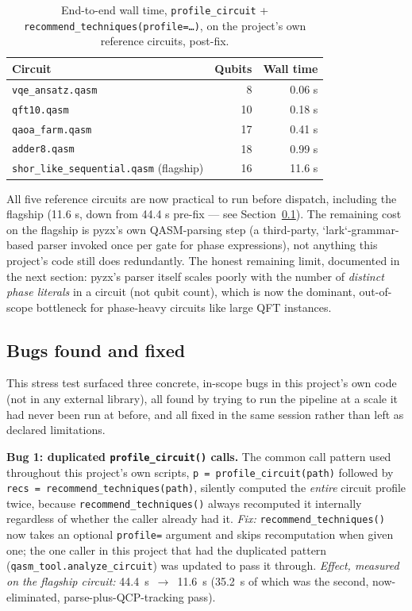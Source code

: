 \documentclass[9pt,twocolumn]{extarticle}
\begin{document}
\begin{table}[t]
\centering\footnotesize
\begin{tabular}{lrr}
\toprule
Circuit & Qubits & Wall time \\
\midrule
\texttt{vqe\_ansatz.qasm} & 8 & 0.06 s \\
\texttt{qft10.qasm} & 10 & 0.18 s \\
\texttt{qaoa\_farm.qasm} & 17 & 0.41 s \\
\texttt{adder8.qasm} & 18 & 0.99 s \\
\texttt{shor\_like\_sequential.qasm} (flagship) & 16 & 11.6 s \\
\bottomrule
\end{tabular}
\caption{End-to-end wall time, \texttt{profile\_circuit} +
\texttt{recommend\_techniques(profile=\ldots)}, on the project's own
reference circuits, post-fix.}
\label{tab:latency}
\end{table}

All five reference circuits are now practical to run before dispatch,
including the flagship (11.6 s, down from 44.4 s pre-fix --- see
Section~\ref{sec:stresstest-bugfixes}). The remaining cost on the flagship
is pyzx's own QASM-parsing step (a third-party, `lark`-grammar-based
parser invoked once per gate for phase expressions), not anything this
project's code still does redundantly. The honest remaining limit,
documented in the next section: pyzx's parser itself scales poorly with
the number of \emph{distinct phase literals} in a circuit (not qubit
count), which is now the dominant, out-of-scope bottleneck for
phase-heavy circuits like large QFT instances.

\subsection{Bugs found and fixed}
\label{sec:stresstest-bugfixes}
This stress test surfaced three concrete, in-scope bugs in this project's
own code (not in any external library), all found by trying to run the
pipeline at a scale it had never been run at before, and all fixed in the
same session rather than left as declared limitations.

\textbf{Bug 1: duplicated \texttt{profile\_circuit()} calls.} The common
call pattern used throughout this project's own scripts,
\texttt{p = profile\_circuit(path)} followed by
\texttt{recs = recommend\_techniques(path)}, silently computed the
\emph{entire} circuit profile twice, because \texttt{recommend\_techniques()}
always recomputed it internally regardless of whether the caller already
had it. \emph{Fix:} \texttt{recommend\_techniques()} now takes an optional
\texttt{profile=} argument and skips recomputation when given one; the one
caller in this project that had the duplicated pattern
(\texttt{qasm\_tool.analyze\_circuit}) was updated to pass it through.
\emph{Effect, measured on the flagship circuit:} 44.4~s~$\to$~11.6~s
(35.2~s of which was the second, now-eliminated, parse-plus-QCP-tracking
pass).
\end{document}
